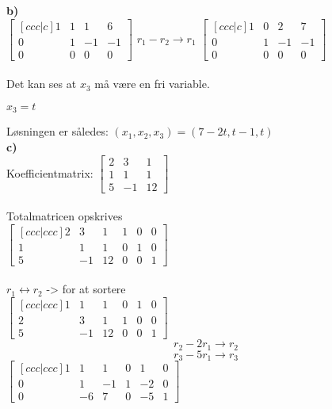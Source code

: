 \documentclass[12pt]{article}
\begin{document}
{\textbf{b)}\\

$
\begin{bmatrix}[ccc|c]
  
1 & 1 & 1 & 6 \\
0 & 1 & -1  &  -1 \\  
0 & 0 & 0 &  0
\end{bmatrix}
$
$r_1 - r_2 \rightarrow r_1$
$
\begin{bmatrix}[ccc|c]
  1 & 0 & 2 & 7 \\
0 & 1 & -1  &  -1 \\  
0 & 0 & 0 &  0
\end{bmatrix}
$\\\\

Det kan ses at $x_3$ må være en fri variable.

$x_3 = t$

Løsningen er således: $(x_1, x_2, x_3) = (7- 2t, t - 1, t)$\\

\textbf{c)}\\
Koefficientmatrix: 
$
\begin{bmatrix}
2 & 3 & 1  \\
1 & 1 & 1  \\  
5 & -1 & 12
\end{bmatrix}
$\\\\

Totalmatricen opskrives\\

$
\begin{bmatrix}[ccc|ccc]
2 & 3 & 1 & 1 & 0 & 0 \\
1 & 1 & 1  & 0 & 1 & 0 \\  
5 & -1 & 12 & 0 & 0 & 1
\end{bmatrix}
$\\\\

$r_1 \leftrightarrow r_2$ -> for at sortere\\

$
\begin{bmatrix}[ccc|ccc]
1 & 1 & 1  & 0 & 1 & 0 \\  
2 & 3 & 1 & 1 & 0 & 0 \\
5 & -1 & 12 & 0 & 0 & 1
\end{bmatrix}
$
$$r_2 - 2r_1 \rightarrow r_2$$
$$r_3 - 5r_1 \rightarrow r_3$$
$
\begin{bmatrix}[ccc|ccc]
1 & 1 & 1  & 0 & 1 & 0 \\  
0 & 1 & -1 & 1 & -2 & 0 \\
0 & -6 & 7 & 0 & -5 & 1
\end{bmatrix}
$

}
\end{document}
